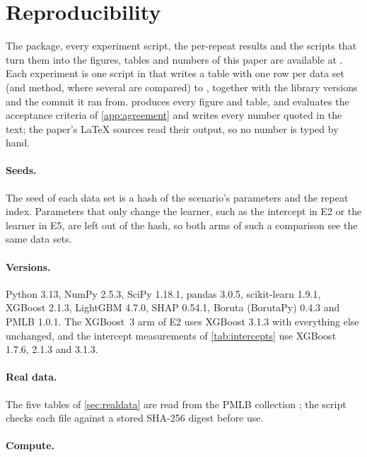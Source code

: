 \section{Reproducibility}\label{app:reproducibility}

The package, every experiment script, the per-repeat results and the scripts that turn them into the figures, tables and numbers of this paper are available at \repourl. Each experiment is one script in  that writes a table with one row per data set (and method, where several are compared) to , together with the library versions and the commit it ran from.  produces every figure and table, and  evaluates the acceptance criteria of \cref{app:agreement} and writes every number quoted in the text; the paper's \LaTeX{} sources read their output, so no number is typed by hand.

\paragraph{Seeds.} The seed of each data set is a hash of the scenario's parameters and the repeat index. Parameters that only change the learner, such as the intercept in E2 or the learner in E5, are left out of the hash, so both arms of such a comparison see the same data sets.

\paragraph{Versions.} Python 3.13, NumPy 2.5.3, SciPy 1.18.1, pandas 3.0.5, scikit-learn 1.9.1, XGBoost 2.1.3, LightGBM 4.7.0, SHAP 0.54.1, Boruta (BorutaPy) 0.4.3 and PMLB 1.0.1. The XGBoost~3 arm of E2 uses XGBoost 3.1.3 with everything else unchanged, and the intercept measurements of \cref{tab:intercepts} use XGBoost 1.7.6, 2.1.3 and 3.1.3.

\paragraph{Real data.} The five tables of \cref{sec:realdata} are read from the PMLB collection \citep{olson2017pmlb}; the script checks each file against a stored SHA-256 digest before use.

\paragraph{Compute.} \numRunTime
